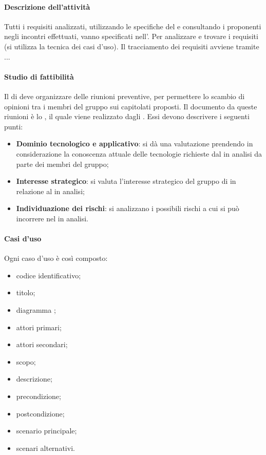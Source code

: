  \paragraph{Descrizione dell'attività}
 Tutti i requisiti analizzati, utilizzando le specifiche del  e consultando i proponenti negli
incontri effettuati, vanno specificati nell'\ARdocRR. Per analizzare e trovare i
requisiti (si utilizza la tecnica dei casi d'uso). Il tracciamento dei requisiti avviene tramite ... 
 \paragraph{Studio di fattibilità}
 Il \RESP{} di  deve organizzare delle riunioni preventive, per permettere lo scambio
di opinioni tra i membri del gruppo sui capitolati proposti. Il documento  da queste
riunioni è lo \SFdocRR , il quale viene realizzato dagli \ANP{}. Essi devono
descrivere i seguenti punti: 
\begin{itemize}
 \item \textbf{Dominio tecnologico e applicativo}: si dà una valutazione prendendo in   considerazione
 la conoscenza attuale delle tecnologie richieste dal  in analisi da parte dei membri  
del gruppo;
 \item \textbf{Interesse strategico}: si valuta l'interesse strategico del gruppo di  in relazione
al  in analisi;
 \item \textbf{Individuazione dei rischi}: si analizzano i possibili rischi a cui si può incorrere nel
 in analisi.
\end{itemize}
 \paragraph{Casi d'uso}
 Ogni caso d'uso è così composto:
 \begin{itemize}
  \item codice identificativo;
  \item titolo;
  \item diagramma ;
  \item attori primari;
  \item attori secondari;
  \item scopo;
  \item descrizione;
  \item precondizione;
  \item postcondizione;
  \item scenario principale;
  \item scenari alternativi.
 \end{itemize}
